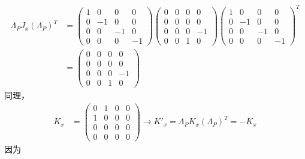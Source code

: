\begin{align}
	\Lambda_P J_x (\Lambda_P)^T &=
		\begin{pmatrix}
			1 & 0 & 0 & 0 \\
			0 & -1 & 0 & 0 \\
			0 & 0 & -1 & 0 \\
			0 & 0 & 0 & -1
		\end{pmatrix}
		\begin{pmatrix}
			0 & 0 & 0 & 0 \\
			0 & 0 & 0 & 0 \\
			0 & 0 & 0 & -1 \\
			0 & 0 & 1 & 0
		\end{pmatrix}
		{
		\begin{pmatrix}
			1 & 0 & 0 & 0 \\
			0 & -1 & 0 & 0 \\
			0 & 0 & -1 & 0 \\
			0 & 0 & 0 & -1
		\end{pmatrix}
		}^T
	\nonumber \\
\label{equ3.150}
	&=
		\begin{pmatrix}
			0 & 0 & 0 & 0 \\
			0 & 0 & 0 & 0 \\
			0 & 0 & 0 & -1 \\
			0 & 0 & 1 & 0
		\end{pmatrix}
\end{align}
同理，
\begin{align}
\label{equ3.151}
	K_x &=
		\begin{pmatrix}
			0 & 1 & 0 & 0 \\
			1 & 0 & 0 & 0 \\
			0 & 0 & 0 & 0 \\
			0 & 0 & 0 & 0
		\end{pmatrix}
	\rightarrow K'_x = \Lambda_P K_x (\Lambda_P)^T = -K_x
\end{align}
因为
